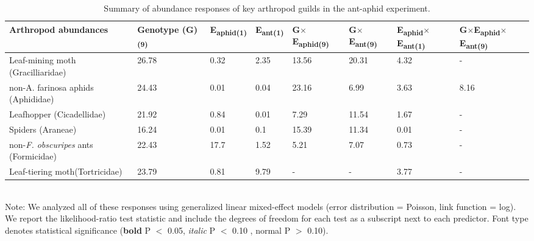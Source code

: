 \documentclass[11pt]{article}
\begin{document}
\begin{table}
\centering
\caption{Summary of abundance responses of key arthropod
guilds in the ant-aphid experiment.}
\label{my-label}
\begin{tabular}{llllllll}
\toprule
Arthropod abundances               & Genotype (G)\textsubscript{(9)} & E\textsubscript{aphid(1)} & E\textsubscript{ant(1)} & G$\times$E\textsubscript{aphid(9)} & G$\times$E\textsubscript{ant(9)} & E\textsubscript{aphid}$\times$E\textsubscript{ant(1)} & G$\times$E\textsubscript{aphid}$\times$E\textsubscript{ant(9)} \\
\midrule
Leaf-mining moth (Gracilliaridae)   & 26.78           & 0.32      & 2.35    & 13.56       & 20.31     & 4.32           & -                \\
non-A. farinosa aphids (Aphididae)  & 24.43           & 0.01      & 0.04    & 23.16       & 6.99      & 3.63           & 8.16             \\
Leafhopper (Cicadellidae)           & 21.92           & 0.84      & 0.01    & 7.29        & 11.54     & 1.67           & -                \\
Spiders (Araneae)                   & 16.24           & 0.01      & 0.1     & 15.39       & 11.34     & 0.01           & -                \\
non-\textit{F. obscuripes} ants (Formicidae) & 22.43           & 17.7      & 1.52    & 5.21        & 7.07      & 0.73           & -                \\
Leaf-tiering moth(Tortricidae)     & 23.79           & 0.81      & 9.79    & -           & -         & 3.77           &    - \\
\bottomrule
\end{tabular}
\bigskip{}
\\
{\footnotesize Note: We analyzed all of these responses
using generalized linear mixed-effect models (error distribution = Poisson, link function = log). We report the likelihood-ratio test statistic and include the degrees of freedom for each test as a subscript next to each predictor. Font type denotes statistical significance (\textbf{bold} P $<$ 0.05, \textit{italic} P $<$ 0.10 , normal P $>$ 0.10).}
\end{table}
\end{document}
